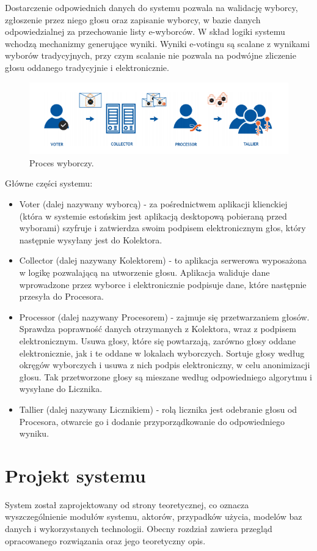 \documentclass[a4paper,13pt]{report}
\begin{document}
Dostarczenie odpowiednich danych do systemu pozwala na walidację wyborcy, zgłoszenie przez 
niego głosu oraz zapisanie wyborcy, w bazie danych odpowiedzialnej za przechowanie listy e-wyborców. W skład logiki systemu wchodzą mechanizmy generujące wyniki. Wyniki e-votingu są scalane z wynikami wyborów tradycyjnych, przy czym scalanie nie pozwala na podwójne zliczenie głosu oddanego tradycyjnie i elektronicznie.

\begin{figure}[h]
    	\centering
	\includegraphics[width=\textwidth]{images/Główne częsci systemu estońskiego.png}
	\caption{Proces wyborczy.}
\end {figure}

Główne części systemu:
\begin{itemize}
    \item Voter (dalej nazywany wyborcą) - za pośrednictwem aplikacji klienckiej (która w systemie estońskim jest aplikacją desktopową pobieraną przed wyborami) szyfruje i zatwierdza swoim podpisem elektronicznym głos, który następnie wysyłany jest do Kolektora.
    \item Collector (dalej nazywany Kolektorem) - to aplikacja serwerowa wyposażona w logikę pozwalającą na utworzenie głosu. Aplikacja waliduje dane wprowadzone przez wyborce i elektronicznie podpisuje dane, które następnie przesyła do Procesora.
    \item Processor (dalej nazywany Procesorem) - zajmuje się przetwarzaniem głosów. Sprawdza poprawność danych otrzymanych z Kolektora, wraz z podpisem elektronicznym. Usuwa głosy, które się powtarzają, zarówno głosy oddane elektronicznie, jak i te oddane w lokalach wyborczych. Sortuje głosy według okręgów wyborczych i usuwa z nich podpis elektroniczny, w celu anonimizacji głosu. Tak przetworzone głosy są mieszane według odpowiedniego algorytmu i wysyłane do Licznika.
    \item Tallier (dalej nazywany Licznikiem) - rolą licznika jest odebranie głosu od Procesora, otwarcie go i dodanie przyporządkowanie do odpowiedniego wyniku.
\end{itemize}
\chapter{Projekt systemu}
System został zaprojektowany od strony teoretycznej, co oznacza wyszczególnienie modułów systemu, aktorów, przypadków użycia, modelów baz danych i wykorzystanych technologii. Obecny rozdział zawiera przegląd opracowanego rozwiązania oraz jego teoretyczny opis.
\end{document}
